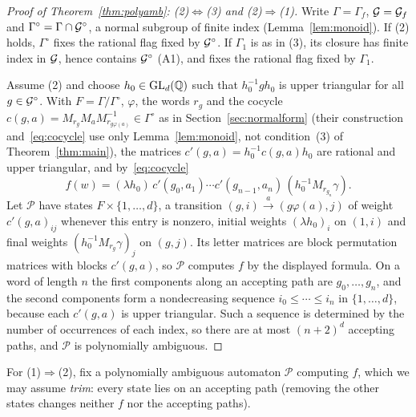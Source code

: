 \begin{proof}[Proof of Theorem~\ref{thm:polyamb}: (2)$\Leftrightarrow$(3) and (2)$\Rightarrow$(1)]
Write $\Gamma=\Gamma_f$, $\mathcal{G}=\mathcal{G}_f$ and $\Gamma^\circ=\Gamma\cap\mathcal{G}^\circ$, a normal subgroup of
finite index (Lemma~\ref{lem:monoid}). If (2) holds, $\Gamma^\circ$ fixes the rational flag fixed by
$\mathcal{G}^\circ$. If $\Gamma_1$ is as in (3), its closure has finite index in $\mathcal{G}$, hence contains
$\mathcal{G}^\circ$ (A1), and fixes the rational flag fixed by $\Gamma_1$.

Assume (2) and choose $h_0\in\mathrm{GL}_d(\mathbb{Q})$ such that $h_0^{-1}gh_0$ is upper triangular for all
$g\in\mathcal{G}^\circ$. With $F=\Gamma/\Gamma^\circ$, $\varphi$, the words $r_g$ and the cocycle
$c(g,a)=M_{r_g}M_aM_{r_{g\varphi(a)}}^{-1}\in\Gamma^\circ$ as in Section~\ref{sec:normalform} (their
construction and~\eqref{eq:cocycle} use only Lemma~\ref{lem:monoid}, not condition~(3) of Theorem~\ref{thm:main}), the
matrices $c'(g,a)=h_0^{-1}c(g,a)h_0$ are rational and upper triangular, and by~\eqref{eq:cocycle}
\[
f(w)=(\lambda h_0)\,c'(g_0,a_1)\cdots c'(g_{n-1},a_n)\,(h_0^{-1}M_{r_{g_n}}\gamma).
\]
Let $\mathcal P$ have states $F\times\{1,\ldots,d\}$, a transition $(g,i)\xrightarrow{a}(g\varphi(a),j)$
of weight $c'(g,a)_{ij}$ whenever this entry is nonzero, initial weights $(\lambda h_0)_i$ on $(1,i)$ and
final weights $(h_0^{-1}M_{r_g}\gamma)_j$ on $(g,j)$. Its letter matrices are block permutation matrices
with blocks $c'(g,a)$, so $\mathcal P$ computes $f$ by the displayed formula. On a word of length $n$
the first components along an accepting path are $g_0,\ldots,g_n$, and the second components form a
nondecreasing sequence $i_0\le\cdots\le i_n$ in $\{1,\ldots,d\}$, because each $c'(g,a)$ is upper
triangular. Such a sequence is determined by the number of occurrences of each index, so there are at most $(n+2)^d$ accepting paths, and $\mathcal P$ is
polynomially ambiguous.
\end{proof}

For (1)$\Rightarrow$(2), fix a polynomially ambiguous automaton $\mathcal P$ computing $f$, which we may
assume \emph{trim}: every state lies on an accepting path (removing the other states changes neither
$f$ nor the accepting paths).

